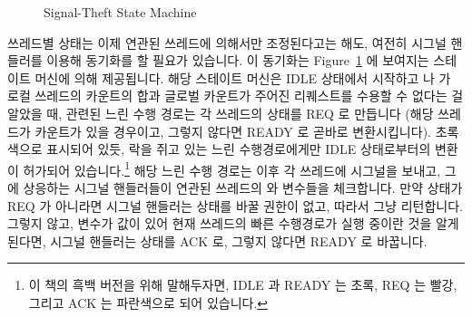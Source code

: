 \begin{figure}[tb]
\centering
{}
\caption{Signal-Theft State Machine}
\label{fig:count:Signal-Theft State Machine}
\end{figure}

쓰레드별 상태는 이제 연관된 쓰레드에 의해서만 조정된다고는 해도, 여전히 시그널
핸들러를 이용해 동기화를 할 필요가 있습니다.
이 동기화는 Figure~\ref{fig:count:Signal-Theft State Machine} 에 보여지는
스테이트 머신에 의해 제공됩니다.
해당 스테이트 머신은 IDLE 상태에서 시작하고  나
 가 로컬 쓰레드의 카운트의 합과 글로벌 카운트가 주어진
리퀘스트를 수용할 수 없다는 걸 알았을 때, 관련된 느린 수행 경로는 각 쓰레드의
 상태를 REQ 로 만듭니다 (해당 쓰레드가 카운트가 있을 경우이고, 그렇지
않다면 READY 로 곧바로 변환시킵니다).
초록색으로 표시되어 있듯,  락을 쥐고 있는 느린 수행경로에게만
IDLE 상태로부터의 변환이 허가되어 있습니다.\footnote{
	이 책의 흑백 버전을 위해 말해두자면, IDLE 과 READY 는 초록, REQ 는
	빨강, 그리고 ACK 는 파란색으로 되어 있습니다.}
해당 느린 수행 경로는 이후 각 쓰레드에 시그널을 보내고, 그에 상응하는 시그널
핸들러들이 연관된 쓰레드의  와  변수들을 체크합니다.
만약  상태가 REQ 가 아니라면 시그널 핸들러는 상태를 바꿀 권한이 없고,
따라서 그냥 리턴합니다.
그렇지 않고,  변수가 값이 있어 현재 쓰레드의 빠른 수행경로가 실행
중이란 것을 알게 된다면, 시그널 핸들러는  상태를 ACK 로, 그렇지
않다면 READY 로 바꿉니다.
\iffalse

